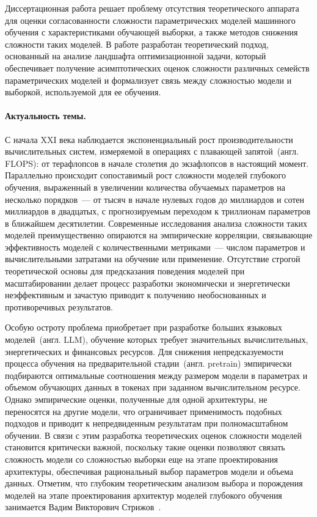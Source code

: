 Диссертационная работа решает проблему отсутствия теоретического аппарата для оценки согласованности сложности параметрических моделей машинного обучения с характеристиками обучающей выборки, а также методов снижения сложности таких моделей.
В работе разработан теоретический подход, основанный на анализе ландшафта оптимизационной задачи, который обеспечивает получение асимптотических оценок сложности различных семейств параметрических моделей и формализует связь между сложностью модели и выборкой, используемой для ее обучения.

\paragraph{Актуальность темы.}
С начала XXI века наблюдается экспоненциальный рост производительности вычислительных систем, измеряемой в операциях с плавающей запятой~(англ. FLOPS): от терафлопсов в начале столетия до экзафлопсов в настоящий момент.
Параллельно происходит сопоставимый рост сложности моделей глубокого обучения, выраженный в увеличении количества обучаемых параметров на несколько порядков~--- от тысяч в начале нулевых годов до миллиардов и сотен миллиардов в двадцатых, с прогнозируемым переходом к триллионам параметров в ближайшем десятилетии.
Современные исследования анализа сложности таких моделей преимущественно опираются на эмпирические корреляции, связывающие эффективность моделей с количественными метриками~--- числом параметров и вычислительными затратами на обучение или применение.
Отсутствие строгой теоретической основы для предсказания поведения моделей при масштабировании делает процесс разработки экономически и энергетически неэффективным и зачастую приводит к получению необоснованных и противоречивых результатов.

Особую остроту проблема приобретает при разработке больших языковых моделей~(англ. LLM), обучение которых требует значительных вычислительных, энергетических и финансовых ресурсов.
Для снижения непредсказуемости процесса обучения на предварительной стадии~(англ. pretrain) эмпирически подбираются оптимальные соотношения между размером модели в параметрах и объемом обучающих данных в токенах при заданном вычислительном ресурсе.
Однако эмпирические оценки, полученные для одной архитектуры, не переносятся на другие модели, что ограничивает применимость подобных подходов и приводит к непредвиденным результатам при полномасштабном обучении.
В связи с этим разработка теоретических оценок сложности моделей становится критически важной, поскольку такие оценки позволяют связать сложность модели со сложностью выборки еще на этапе проектирования архитектуры, обеспечивая рациональный выбор параметров модели и объема данных.
Отметим, что глубоким теоретическим анализом выбора и порождения моделей на этапе проектирования архитектур моделей глубокого обучения занимается Вадим Викторович Стрижов~\cite{strijov2014doctoral}.

